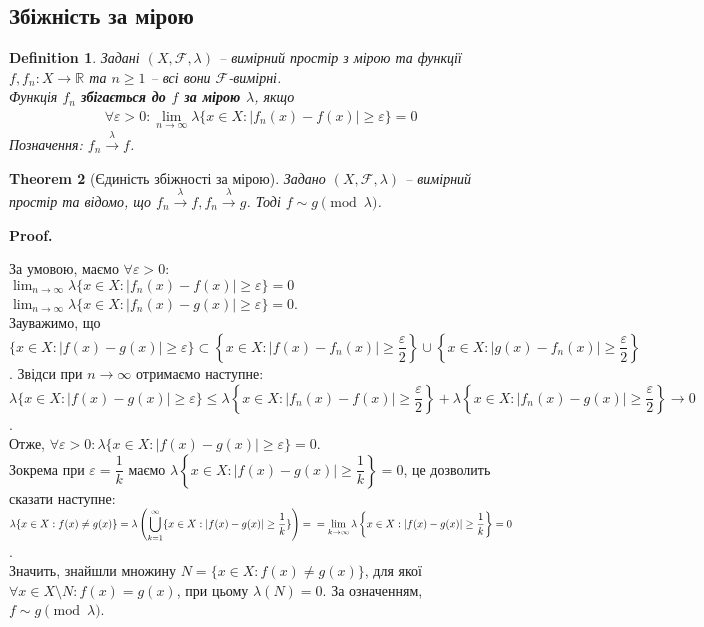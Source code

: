 \documentclass[a4paper, 10pt]{article}
\makeatletter
\theoremstyle{theoremdd}
\newtheorem{theorem}{Theorem}[subsection]
\newtheorem{definition}[theorem]{Definition}
\newcommand\tomeasure[1]{\overset{{#1}}{\to}}
\renewenvironment{proof}[1][Proof.\\]{\par
\pushQED{\hfill \qed}%
\normalfont \topsep6\p@\@plus6\p@\relax
\trivlist
\item\relax
{\bfseries
#1\@addpunct{.}}\hspace\labelsep\ignorespaces
}{%
\popQED\endtrivlist\@endpefalse
}
\makeatother
\begin{document}
\subsection{Збіжність за мірою}
\begin{definition}
Задані $(X,\mathcal{F},\lambda)$ -- вимірний простір з мірою та функції $f,f_n \colon X \to \mathbb{R}$ та $n \geq 1$ -- всі вони $\mathcal{F}$-вимірні.\\
Функція $f_n$ \textbf{збігається до $f$ за мірою $\lambda$}, якщо
\begin{align*}
\forall \varepsilon > 0: \lim_{n \to \infty} \lambda \{ x \in X: |f_n(x) - f(x)| \geq \varepsilon\} = 0
\end{align*}
Позначення: $f_n \tomeasure{\lambda} f$.
\end{definition}

\begin{theorem}[Єдиність збіжності за мірою]
Задано $(X,\mathcal{F},\lambda)$ -- вимірний простір та відомо, що $f_n \tomeasure{\lambda} f, f_n \tomeasure{\lambda} g$. Тоді $f \sim g \pmod \lambda$.
\end{theorem}

\begin{proof}
За умовою, маємо $\forall \varepsilon > 0:$\\
$\displaystyle \lim_{n \to \infty} \lambda \{ x \in X: |f_n(x) - f(x)| \geq \varepsilon\} = 0$ \qquad $\displaystyle \lim_{n \to \infty} \lambda \{ x \in X: |f_n(x) - g(x)| \geq \varepsilon\} = 0$.\\
Зауважимо, що $\{ x \in X: |f(x)-g(x)| \geq \varepsilon \} \subset \left\{ x \in X: |f(x)-f_n(x)| \geq \dfrac{\varepsilon}{2} \right\} \cup \left\{ x \in X: |g(x)-f_n(x)| \geq \dfrac{\varepsilon}{2} \right\}$. Звідси при $n \to \infty$ отримаємо наступне:\\
$\lambda\{x \in X: |f(x)-g(x)| \geq \varepsilon\} \leq \lambda\left\{x \in X: |f_n(x)-f(x)| \geq \dfrac{\varepsilon}{2}\right\} + \lambda\left\{x \in X: |f_n(x)-g(x)| \geq \dfrac{\varepsilon}{2}\right\} \to 0$.\\
Отже, $\forall \varepsilon > 0: \lambda\{x \in X: |f(x)-g(x)| \geq \varepsilon\} = 0$.\\
Зокрема при $\varepsilon = \dfrac{1}{k}$ маємо $\lambda\left\{ x \in X: |f(x)-g(x)| \geq \dfrac{1}{k} \right\} = 0$, це дозволить сказати наступне:\\
$\lambda\{x \in X: f(x) \neq g(x)\} = \displaystyle\lambda\left(\bigcup_{k=1}^\infty \{x \in X: |f(x)-g(x)| \geq \dfrac{1}{k}\}\right) = \\ =\lim_{k \to \infty} \lambda\left\{x \in X: |f(x)-g(x)| \geq \dfrac{1}{k}\right\} = 0$.\\
Значить, знайшли множину $N = \{x \in X: f(x) \neq g(x)\}$, для якої $\forall x \in X \setminus N: f(x) = g(x)$, при цьому $\lambda(N) = 0$. За означенням, $f \sim g \pmod \lambda$.
\end{proof}
\end{document}
